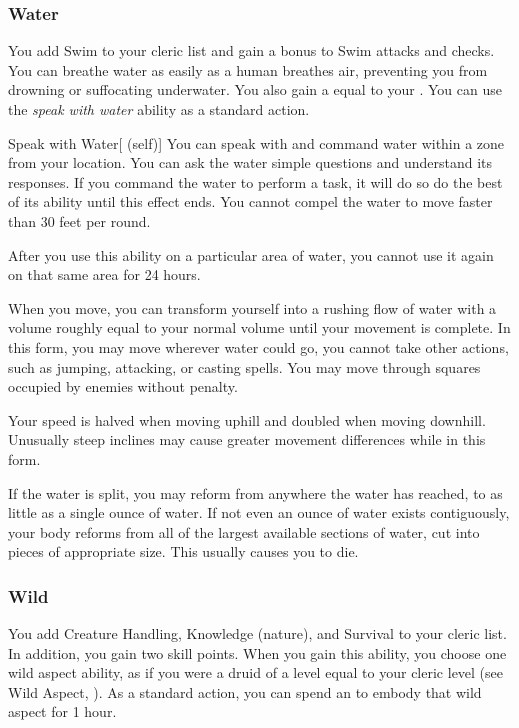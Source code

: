         \subsubsection{Water}
             You add Swim to your cleric  list and gain a  bonus to Swim attacks and checks.
             You can breathe water as easily as a human breathes air, preventing you from drowning or suffocating underwater.
            You also gain a  equal to your .
             You can use the \textit{speak with water} ability as a standard action.
            \begin{attuneability}{Speak with Water}[ (self)]
                You can speak with and command water within a \areahuge zone from your location.
                You can ask the water simple questions and understand its responses.
                If you command the water to perform a task, it will do so do the best of its ability until this effect ends.
                You cannot compel the water to move faster than 30 feet per round.

                After you use this ability on a particular area of water, you cannot use it again on that same area for 24 hours.
            \end{attuneability}
            When you move, you can transform yourself into a rushing flow of water with a volume roughly equal to your normal volume until your movement is complete.
            In this form, you may move wherever water could go, you cannot take other actions, such as jumping, attacking, or casting spells.
            You may move through squares occupied by enemies without penalty.
            \par Your speed is halved when moving uphill and doubled when moving downhill.
            Unusually steep inclines may cause greater movement differences while in this form.
            \par If the water is split, you may reform from anywhere the water has reached, to as little as a single ounce of water.
            If not even an ounce of water exists contiguously, your body reforms from all of the largest available sections of water, cut into pieces of appropriate size.
            This usually causes you to die.

        \subsubsection{Wild}
             You add Creature Handling, Knowledge (nature), and Survival to your cleric  list.
            In addition, you gain two skill points.
             When you gain this ability, you choose one wild aspect ability, as if you were a druid of a level equal to your cleric level (see Wild Aspect, ).
            As a standard action, you can spend an  to embody that wild aspect for 1 hour.

